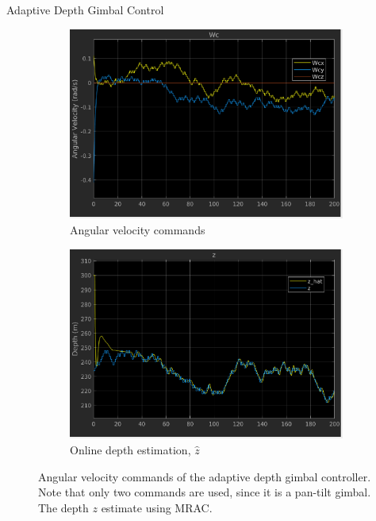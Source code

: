 \documentclass[9pt]{beamer}
\newenvironment{figure*}%
{\begin{figure}}
{\end{figure}}
\begin{document}
\begin{frame}{Adaptive Depth Gimbal Control}
\begin{figure}[htbp]
	\centering
	\begin{subfigure}{0.5\textwidth}
		\centering
		\includegraphics[width=0.8\linewidth]{chapter2/angular_velocity_adaptive}
		\caption{Angular velocity commands}
	\end{subfigure}%
	\begin{subfigure}{0.5\textwidth}
		\centering
		\includegraphics[width=0.8\linewidth]{chapter2/z_adaptive}
		\caption{Online depth estimation, $\hat{z}$}
	\end{subfigure}
	\caption{Angular velocity commands of the adaptive depth gimbal controller. Note that only two commands are used, since it is a pan-tilt gimbal. The depth $z$ estimate using MRAC.}
	\label{adaptive_command}
\end{figure}	
\end{frame}
\end{document}

